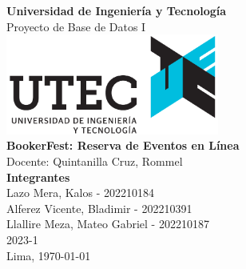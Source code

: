 \documentclass[a4paper, 11pt, oneside]{article}
\begin{document}
    \begin{titlepage}
        \begin{center}
            \vfill
            \Large \textbf{Universidad de Ingeniería y Tecnología}\\[.5cm]
            \large Proyecto de Base de Datos I\\[1cm]
            \vfill
            \includegraphics[width=7cm]{figures/utecLogo.png}\\[1cm]
            \vfill
            \Large \textbf{BookerFest: Reserva de Eventos en Línea}\\[.5cm]
            \large Docente: Quintanilla Cruz, Rommel\\[1cm]
            \vfill
            \Large \textbf{Integrantes}\\[0.5cm]
            \large Lazo Mera, Kalos - 202210184\\[0.2cm]
            \large Alferez Vicente, Bladimir - 202210391\\[0.2cm]
            \large Llallire Meza, Mateo Gabriel - 202210187\\[2cm]
            \vfill
            {\large 2023-1}\\[0.5cm]
            {\large Lima, \today}\\[0.5cm]
            \vfill
        \end{center}
    \end{titlepage}

    \newpage
    \onehalfspacing 
    \tableofcontents
    \setlength\parindent{0pt}

    
    
    
\end{document}
